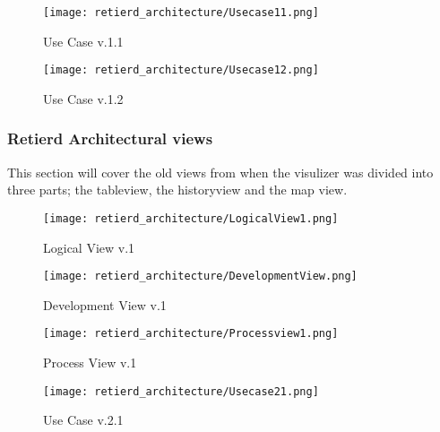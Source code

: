 \documentclass[../document]{subfiles}
\begin{document}
\begin{figure}[H]
	\centering
	\texttt{[image: retierd\_architecture/Usecase11.png]}
	\caption{Use Case v.1.1}
\end{figure}

\begin{figure}[H]
	\centering
	\texttt{[image: retierd\_architecture/Usecase12.png]}
	\caption{Use Case v.1.2}
\end{figure}

\subsubsection{Retierd Architectural views}
\label{retierd_architectural_views}
This section will cover the old views from when the visulizer was divided into three parts; the tableview, the historyview and the map view. 


\begin{figure}[H]
	\centering
	\texttt{[image: retierd\_architecture/LogicalView1.png]}
	\caption{Logical View v.1}
\end{figure}

\begin{figure}[H]
	\centering
	\texttt{[image: retierd\_architecture/DevelopmentView.png]}
	\caption{Development View v.1}
\end{figure}


\begin{figure}[H]
	\centering
	\texttt{[image: retierd\_architecture/Processview1.png]}
	\caption{Process View v.1}
\end{figure}

\begin{figure}[H]
	\centering
	\texttt{[image: retierd\_architecture/Usecase21.png]}
	\caption{Use Case v.2.1}
\end{figure}
\end{document}
